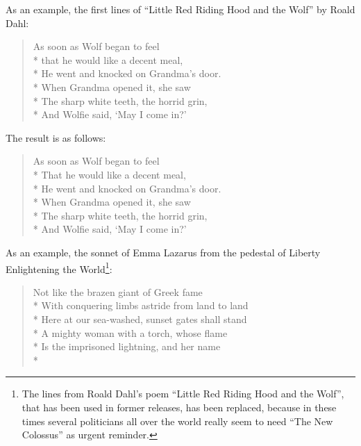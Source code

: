     \begin{Example}
\iffalse
      As an example, the first lines of ``Little Red Riding Hood and the
      Wolf'' by Roald Dahl:
\begin{lstcode}
  \begin{verse}
    As soon as Wolf began to feel\\*
    that he would like a decent meal,\\*
    He went and knocked on Grandma's door.\\*
    When Grandma opened it, she saw\\*
    The sharp white teeth, the horrid grin,\\*
    And Wolfie said, `May I come in?'
  \end{verse}
\end{lstcode}
      The result is as follows:
      \begin{ShowOutput}
        \begin{verse}
          As soon as Wolf began to feel\\*
          That he would like a decent meal,\\*
          He went and knocked on Grandma's door.\\*
          When Grandma opened it, she saw\\*
          The sharp white teeth, the horrid grin,\\*
          And Wolfie said, `May I come in?'
        \end{verse}
      \end{ShowOutput}
\else
      As an example, the sonnet of Emma Lazarus from the pedestal of Liberty
      Enlightening the World\footnote{The lines from Roald Dahl's poem
        ``Little Red Riding Hood and the Wolf'', that has been used in former
        releases, has been replaced, because in these times several
        politicians all over the world really seem to need ``The New
        Colossus'' as urgent reminder.}:
\begin{lstcode}
  \begin{verse}
    Not like the brazen giant of Greek fame\\*
    With conquering limbs astride from land to land\\*
    Here at our sea-washed, sunset gates shall stand\\*
    A mighty woman with a torch, whose flame\\*
    Is the imprisoned lightning, and her name\\*

\end{verse}
\end{lstcode}
\end{Example}
